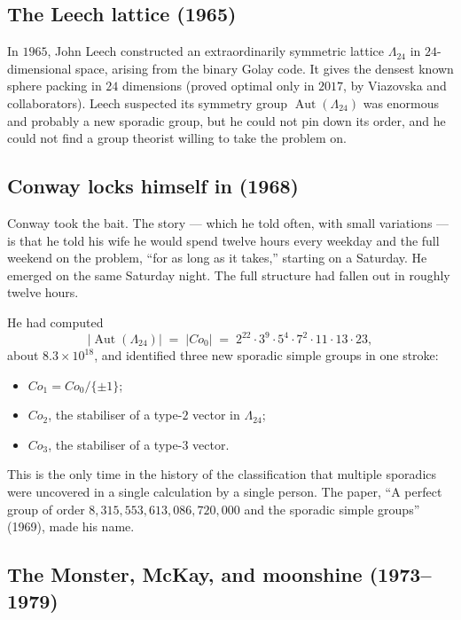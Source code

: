 \documentclass[11pt]{article}
\begin{document}
\subsection*{The Leech lattice (1965)}

In $1965$, John Leech constructed an extraordinarily symmetric lattice
$\Lambda_{24}$ in $24$-dimensional space, arising from the binary
Golay code. It gives the densest known sphere packing in
$24$ dimensions (proved optimal only in $2017$, by Viazovska and
collaborators). Leech suspected its symmetry group
$\operatorname{Aut}(\Lambda_{24})$ was enormous and probably a new
sporadic group, but he could not pin down its order, and he could
not find a group theorist willing to take the problem on.

\subsection*{Conway locks himself in (1968)}

Conway took the bait. The story --- which he told often, with small
variations --- is that he told his wife he would spend twelve hours
every weekday and the full weekend on the problem, ``for as long as
it takes,'' starting on a Saturday. He emerged on the same Saturday
night. The full structure had fallen out in roughly twelve hours.

He had computed
\[
|\operatorname{Aut}(\Lambda_{24})| \;=\; |\mathit{Co}_0| \;=\;
2^{22} \cdot 3^9 \cdot 5^4 \cdot 7^2 \cdot 11 \cdot 13 \cdot 23 ,
\]
about $8.3 \times 10^{18}$, and identified three new sporadic simple
groups in one stroke:
\begin{itemize}[leftmargin=*, itemsep=2pt]
  \item $\mathit{Co}_1 = \mathit{Co}_0 / \{\pm 1\}$;
  \item $\mathit{Co}_2$, the stabiliser of a type-$2$ vector in
        $\Lambda_{24}$;
  \item $\mathit{Co}_3$, the stabiliser of a type-$3$ vector.
\end{itemize}
This is the only time in the history of the classification that
multiple sporadics were uncovered in a single calculation by a
single person. The paper, ``A perfect group of order
$8{,}315{,}553{,}613{,}086{,}720{,}000$ and the sporadic simple
groups'' (1969), made his name.

\subsection*{The Monster, McKay, and moonshine (1973--1979)}
\end{document}
